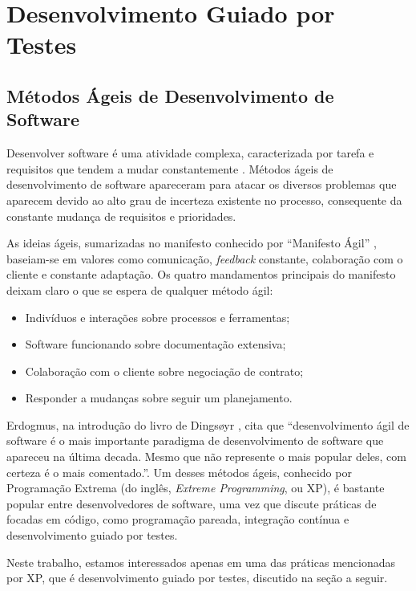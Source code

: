 \chapter{Desenvolvimento Guiado por Testes}
\label{cap:tdd}

\section{Métodos Ágeis de Desenvolvimento de Software}

Desenvolver software é uma atividade complexa, caracterizada por tarefa e
requisitos que tendem a mudar constantemente \cite{boehm-turner}. Métodos ágeis
de desenvolvimento de software apareceram para atacar os diversos problemas que
aparecem devido ao alto grau de incerteza existente no processo, consequente da
constante mudança de requisitos e prioridades.

As ideias ágeis, sumarizadas no manifesto conhecido por ``Manifesto Ágil''
, baseiam-se em valores como comunicação, \textit{feedback}
constante, colaboração com o cliente e constante adaptação. Os quatro
mandamentos principais do manifesto deixam claro o que se espera de qualquer
método ágil:

\begin{itemize}
  \item Indivíduos e interações sobre processos e ferramentas;
  \item Software funcionando sobre documentação extensiva;
  \item Colaboração com o cliente sobre negociação de contrato;
  \item Responder a mudanças sobre seguir um planejamento.
\end{itemize}

Erdogmus, na introdução do livro de Dingsøyr \cite{dingsoyr}, cita que
``desenvolvimento ágil de software é o mais importante paradigma de desenvolvimento de software que
apareceu na última decada. Mesmo que não represente o mais popular deles, com
certeza é o mais comentado.''. Um desses métodos ágeis, conhecido por
Programação Extrema (do inglês, \textit{Extreme Programming}, ou XP), é bastante
popular entre desenvolvedores de software, uma vez que discute práticas de
focadas em código, como programação pareada, integração contínua e
desenvolvimento guiado por testes.

Neste trabalho, estamos interessados apenas em uma das práticas mencionadas
por XP, que é desenvolvimento guiado por testes, discutido na seção a seguir.

